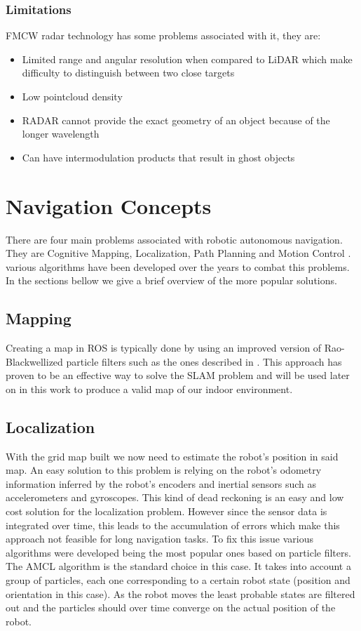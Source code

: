 \subsubsection{Limitations}
\ac{FMCW} {radar} technology has some problems associated with it, they are:
\begin{itemize}
\item{Limited range and angular resolution when compared to \ac{LiDAR} which make difficulty to distinguish between two close targets}  
\item{Low pointcloud density}  
\item{RADAR cannot provide the exact geometry of an object because of the longer wavelength}  
\item{Can have intermodulation products that result in ghost objects} 
\end{itemize}


\section {Navigation Concepts}
There are four main problems associated with robotic autonomous navigation. They are Cognitive Mapping, Localization, Path Planning and Motion Control \cite{baranov2014}.  various algorithms have been developed over the years to combat this problems. In the sections bellow we give a brief overview of the more popular solutions.

\subsection{Mapping}

Creating a map in ROS is typically done by using an improved version of  Rao-Blackwellized particle filters such as the ones described in \cite{grisetti2007improved}. This approach has proven to be an effective way to solve the \ac{SLAM} problem and will be used later on in this work to produce a valid map of our indoor environment.
\subsection{Localization}
With the grid map built we now need to estimate the robot's position in said map. 
An easy solution to this problem is relying on the robot's odometry information inferred by the robot's encoders and inertial sensors such as accelerometers and gyroscopes. This kind of dead reckoning is an easy and low cost solution for the localization problem. However since the sensor data is integrated over time, this leads to the accumulation of errors which make this approach not feasible for long navigation tasks. 
To fix this issue various algorithms were developed being the most popular ones based on particle filters.
The \ac{AMCL} algorithm  is the standard choice in this case. It takes into account a group of particles, each one corresponding to a certain robot state (position and orientation in this case). As the robot moves the least probable states are filtered out and  the particles should over time converge on the actual position of the robot.  
